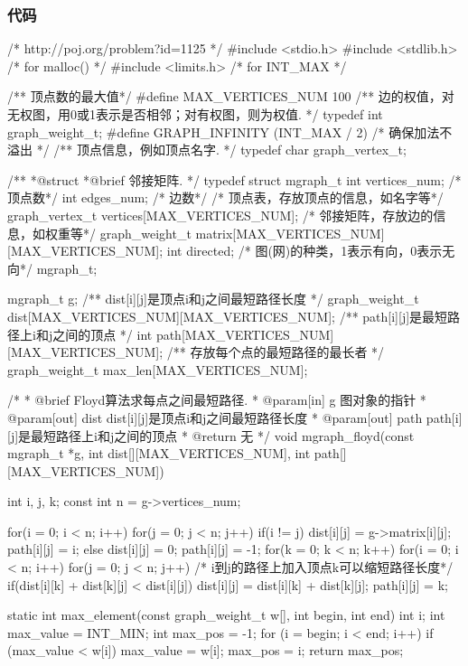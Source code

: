 \subsubsection{代码}
\begin{Codex}[label=poj_1125.c]
/* http://poj.org/problem?id=1125 */
#include <stdio.h>
#include <stdlib.h>  /* for malloc() */
#include <limits.h>  /* for INT_MAX */

/** 顶点数的最大值*/
#define MAX_VERTICES_NUM 100
/** 边的权值，对无权图，用0或1表示是否相邻；对有权图，则为权值. */
typedef int graph_weight_t;
#define GRAPH_INFINITY (INT_MAX / 2)   /* 确保加法不溢出 */
/** 顶点信息，例如顶点名字. */
typedef char graph_vertex_t;

/**
 *@struct
 *@brief 邻接矩阵.
 */
typedef struct mgraph_t {
    int vertices_num; /* 顶点数*/
    int edges_num; /* 边数*/
    /* 顶点表，存放顶点的信息，如名字等*/
    graph_vertex_t vertices[MAX_VERTICES_NUM];
    /* 邻接矩阵，存放边的信息，如权重等*/
    graph_weight_t matrix[MAX_VERTICES_NUM][MAX_VERTICES_NUM];
    int directed; /* 图(网)的种类，1表示有向，0表示无向*/
} mgraph_t;


mgraph_t g;
/** dist[i][j]是顶点i和j之间最短路径长度 */
graph_weight_t dist[MAX_VERTICES_NUM][MAX_VERTICES_NUM];
/** path[i][j]是最短路径上i和j之间的顶点 */
int path[MAX_VERTICES_NUM][MAX_VERTICES_NUM];
/** 存放每个点的最短路径的最长者 */
graph_weight_t max_len[MAX_VERTICES_NUM];

/*
  * @brief Floyd算法求每点之间最短路径.
  * @param[in] g 图对象的指针
  * @param[out] dist dist[i][j]是顶点i和j之间最短路径长度
  * @param[out] path path[i][j]是最短路径上i和j之间的顶点
  * @return 无
  */
void mgraph_floyd(const mgraph_t *g,
       int dist[][MAX_VERTICES_NUM],
       int path[][MAX_VERTICES_NUM]) {
    int i, j, k;
    const int n = g->vertices_num;

    for(i = 0; i < n; i++) {
        for(j = 0; j < n; j++) {
            if(i != j) {
                dist[i][j] = g->matrix[i][j];
                path[i][j] = i;
            } else {
                dist[i][j] = 0;
                path[i][j] = -1;
            }
        }
    }
    for(k = 0; k < n; k++) {
        for(i = 0; i < n; i++) {
            for(j = 0; j < n; j++) {
                /* i到j的路径上加入顶点k可以缩短路径长度*/
                if(dist[i][k] + dist[k][j] < dist[i][j]) {
                    dist[i][j] = dist[i][k] + dist[k][j];
                    path[i][j] = k;
                }
            }
        }
    }
}

static int max_element(const graph_weight_t w[], int begin, int end) {
    int i;
    int max_value = INT_MIN;
    int max_pos = -1;
    for (i = begin; i < end; i++) {
        if (max_value < w[i]) {
            max_value = w[i];
            max_pos = i;
        }
    }
    return max_pos;
}


\end{Codex}
